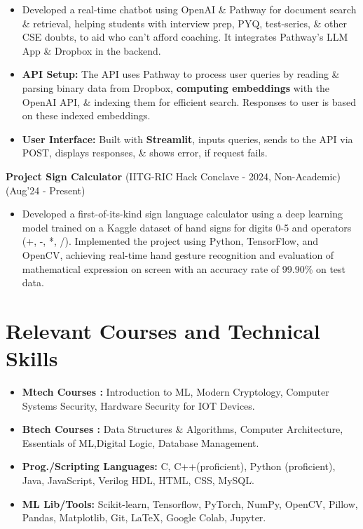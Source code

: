 \documentclass[10.8pt, a4paper]{extarticle}
\newcommand{\shorterSection}[1]{\vspace{-10pt}\section{#1}}
\begin{document}
	\begin{itemize}
 
        \item Developed a real-time chatbot using OpenAI \& Pathway for document search \& retrieval, helping students with interview prep, PYQ, test-series, \& other CSE doubts, to aid who can't afford coaching. It integrates Pathway’s LLM App \& Dropbox in the backend.

        \item \textbf{API Setup: }The API uses Pathway to process user queries by reading \& parsing binary data from Dropbox, \textbf{computing embeddings} with the OpenAI API, \& indexing them for efficient search. Responses to user is based on these indexed embeddings.

        \item \textbf{User Interface: }Built with \textbf{Streamlit}, inputs queries, sends to the API via POST, displays responses, \& shows error, if request fails.
	\end{itemize}

\vspace{0.5mm}

\textbf{Project Sign Calculator} (IITG-RIC Hack Conclave - 2024, Non-Academic) \href{https://github.com/souvikcseiitk/sign-calculator}{\faGithub{}} \href{https://nbviewer.org/github/souvikcseiitk/sign-calculator/blob/main/0_main.ipynb}{\faLink{}} \hfill(Aug'24 - Present) \\
         
	\begin{itemize}
 
        \item Developed a first-of-its-kind sign language calculator using a deep learning model trained on a Kaggle dataset of hand signs for digits 0-5 and operators (+, -, *, /). Implemented the project using Python, TensorFlow, and OpenCV, achieving real-time hand gesture recognition and evaluation of mathematical expression on screen with an accuracy rate of 99.90\% on test data.
        \end{itemize}

\vspace{1mm}



\shorterSection{Relevant Courses and Technical Skills}
\begin{itemize}
\item \textbf{Mtech Courses :} Introduction to ML, Modern Cryptology, Computer Systems Security, Hardware Security for IOT Devices.
\item \textbf{Btech Courses :} Data Structures \& Algorithms, Computer Architecture, Essentials of ML,Digital Logic, Database Management.
\item \textbf{Prog./Scripting Languages:} C, C++(proficient), Python (proficient), Java, JavaScript, Verilog HDL, HTML, CSS, MySQL.
\item \textbf{ML Lib/Tools:} Scikit-learn, Tensorflow, PyTorch, NumPy, OpenCV, Pillow, Pandas, Matplotlib, Git, \LaTeX, Google Colab, Jupyter. 
 \medskip
\end{itemize}
\end{document}
